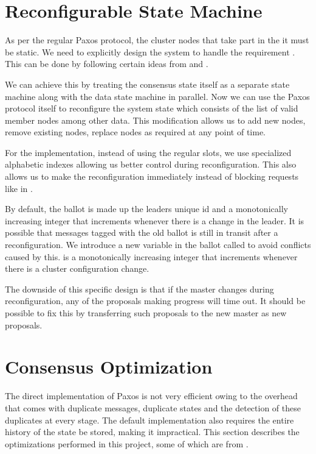 \section{Reconfigurable State Machine}
\label{section:a.n.d.reconfig}

As per the regular Paxos protocol, the cluster nodes that take part in the
it must be static. We need to explicitly design the system to handle
the requirement . This can be done by
following certain ideas from \citet{LamportSP08} and \citet{LamportMZ10}.

We can achieve this by treating the consensus state itself as a separate
state machine along with the data state machine in parallel. Now we can use
the Paxos protocol itself to reconfigure the system state which consists
of the list of valid member nodes among other data. This modification allows
us to add new nodes, remove existing nodes, replace nodes as required at any
point of time.

For the implementation, instead of using the regular slots, we use specialized
alphabetic indexes allowing us better control during reconfiguration. This also
allows us to make the reconfiguration immediately instead of blocking requests
like in \citet{LamportSP08}.

By default, the ballot is made up the leaders unique id and a monotonically
increasing
integer that increments whenever there is a change in the leader. It is possible
that messages tagged with the old ballot is still in transit after a
reconfiguration. We introduce a new variable in the ballot called  to
avoid conflicts caused by this.  is a monotonically
increasing integer that increments whenever there is a cluster
configuration change.

The downside of this specific design is that if the master changes during
reconfiguration, any of the proposals making progress will time out. It
should be possible to fix this by transferring such proposals to the new master
as new proposals.

\section{Consensus Optimization}
\label{section:consensus.optimization}

The direct implementation of Paxos is not very efficient owing to the overhead
that comes with duplicate messages, duplicate states and the detection of these
duplicates at every stage. The default implementation also requires the
entire history of the
state be stored, making it impractical. This section describes the optimizations
performed in this project, some of which are from \citet{Robbert2011}.


